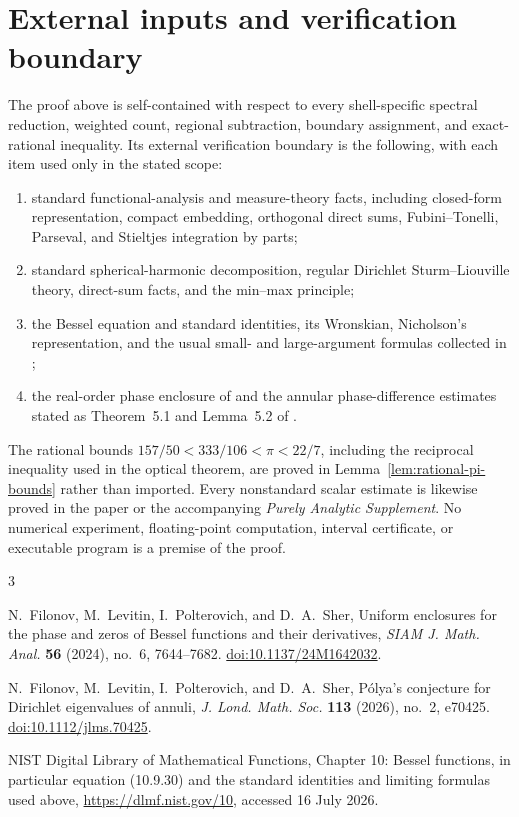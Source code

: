 \documentclass[11pt]{article}
\numberwithin{equation}{section}
\theoremstyle{definition}
\theoremstyle{remark}
\begin{document}
\section{External inputs and verification boundary}
\label{app:external-boundary}

The proof above is self-contained with respect to every shell-specific
spectral reduction, weighted count, regional subtraction, boundary assignment,
and exact-rational inequality.  Its external verification boundary is the
following, with each item used only in the stated scope:
\begin{enumerate}
  \item standard functional-analysis and measure-theory facts, including
        closed-form representation, compact embedding, orthogonal direct
        sums, Fubini--Tonelli, Parseval, and Stieltjes integration by parts;
  \item standard spherical-harmonic decomposition, regular
        Dirichlet Sturm--Liouville theory, direct-sum facts, and the min--max
        principle;
  \item the Bessel equation and standard identities, its Wronskian,
        Nicholson's representation, and the usual small- and large-argument
        formulas collected in \cite{DLMF};
  \item the real-order phase enclosure of \cite{FLPSphase} and the annular
        phase-difference estimates stated as Theorem~5.1 and Lemma~5.2 of
        \cite{FLPSannuli}.
\end{enumerate}

The rational bounds
\(157/50<333/106<\pi<22/7\), including the reciprocal inequality used in
the optical theorem, are proved in Lemma~\ref{lem:rational-pi-bounds} rather
than imported.  Every nonstandard scalar estimate is likewise proved in the
paper or the accompanying \emph{Purely Analytic Supplement}.  No numerical
experiment, floating-point computation, interval certificate, or executable
program is a premise of the proof.

\begin{thebibliography}{3}

N.~Filonov, M.~Levitin, I.~Polterovich, and D.~A.~Sher,
\newblock Uniform enclosures for the phase and zeros of Bessel functions and
their derivatives,
\newblock \emph{SIAM J. Math. Anal.} \textbf{56} (2024), no.~6, 7644--7682.
\newblock \href{https://doi.org/10.1137/24M1642032}{doi:10.1137/24M1642032}.

N.~Filonov, M.~Levitin, I.~Polterovich, and D.~A.~Sher,
\newblock P\'olya's conjecture for Dirichlet eigenvalues of annuli,
\newblock \emph{J. Lond. Math. Soc.} \textbf{113} (2026), no.~2, e70425.
\newblock \href{https://doi.org/10.1112/jlms.70425}{doi:10.1112/jlms.70425}.

NIST Digital Library of Mathematical Functions,
\newblock Chapter 10: Bessel functions, in particular equation (10.9.30)
and the standard identities and limiting formulas used above,
\newblock \url{https://dlmf.nist.gov/10}, accessed 16 July 2026.

\end{thebibliography}
\end{document}
